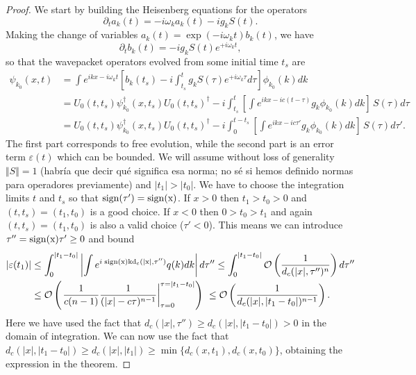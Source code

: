 \documentclass[notitlepage, prx, preprint, amsmath,superscriptaddress,amssymb]{revtex4-1}
\begin{document}
\begin{proof}
We start by building the Heisenberg equations for the operators
\begin{equation}
\partial_t a_k(t) = -i\omega_k a_k(t) - i g_k S(t).
\end{equation}
Making the change of variables $a_k(t) = \exp(-i\omega_k t)b_k(t)$, we have
\begin{equation}
\partial_t b_k(t) = -ig_k S(t) e^{+i\omega_k t},
\end{equation}
so that the wavepacket operators evolved from some initial time $t_{s}$ are
\begin{align}
\psi_{k_0}(x,t) &= \int e^{ik x - i \omega_k t} \left[b_k(t_s)
-i\int_{t_{s}}^t g_k S(\tau)e^{+i\omega_k \tau}d\tau\right]\phi_{k_0}(k)dk\\
&=U_0(t,t_s)\psi^{\dagger}_{k_0}(x,t_s)U_0(t,t_s)^\dagger - 
i\int_{t_{s}}^t \left[\int e^{ikx-ic(t-\tau)}g_k\phi_{k_0}(k)dk
\right]\,S(\tau)d\tau\\
&=U_0(t,t_s)\psi^{\dagger}_{k_0}(x,t_s)U_0(t,t_s)^\dagger- 
i\int_{0}^{t-t_s} \left[\int e^{ikx-ic\tau'}g_k\phi_{k_0}(k)dk
\right]\,S(\tau)d\tau'.
\end{align}
The first part corresponds to free evolution, while the second part is an error term $\varepsilon(t)$ which can be bounded. We will assume without loss of generality $\Vert{S}\Vert=1$ {\color{red}(habría que decir qué significa esa norma; no sé si hemos definido normas para operadores previamente)} and $|t_1|>|t_0|$. We have to choose the integration limits $t$ and $t_s$ so that $\rm{sign}(\tau')=\rm{sign}(x)$. If $x>0$ then $t_1>t_0>0$ and $(t,t_s)=(t_1,t_0)$ is a good choice. If $x<0$ then $0>t_0>t_1$ and again $(t,t_s)=(t_1,t_0)$ is also a valid choice ($\tau'<0$). This means we can introduce $\tau''=\rm{sign}(x)\tau'\geq 0$ and bound
\begin{align}
|\varepsilon(t_1)|
&\leq \int_{0}^{|t_1-t_0|} \left|\int e^{i\;\rm{sign}(x)kd_c(|x|,\tau'')}q(k)dk\right|d\tau''
\leq \int_{0}^{|t_1-t_0|} \mathcal{O}\left(\frac{1}{d_c(|x|,\tau'')^{n}}\right)d\tau''\\
&\leq \mathcal{O}\left(
\left. \frac{1}{c(n-1)} \frac{1}{(|x|-c\tau)^{n-1}}\right|_{\tau=0}^{\tau=|t_1-t_0|}\right)\
\leq \mathcal{O}\left(\frac{1}{d_c(|x|,|t_1-t_0|)^{n-1}}\right).
\end{align}
Here we have used the fact that $d_c(|x|,\tau'')\geq d_c(|x|,|t_1-t_0|)> 0$ in the domain of integration. We can now use the fact that $d_c(|x|,|t_1-t_0|)\geq d_c(|x|,|t_1|)\geq \min\{d_c(x,t_1),d_c(x,t_0)\}$, obtaining the expression in the theorem.
\end{proof}
\end{document}
